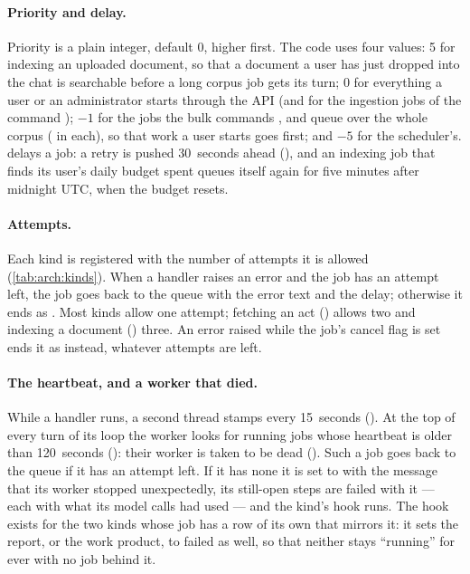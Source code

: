 \paragraph{Priority and delay.} Priority is a plain integer, default 0, higher first. The
code uses four values: 5 for indexing an uploaded document, so that a document a user has
just dropped into the chat is searchable before a long corpus job gets its turn; 0 for
everything a user or an administrator starts through the API (and for the ingestion jobs of
the command ); $-1$ for the jobs the bulk commands
,  and  queue over
the whole corpus ( in each), so that work a user starts goes first; and $-5$
for the scheduler's.  delays
a job: a retry is pushed 30~seconds ahead (), and an indexing job that finds
its user's daily budget spent queues itself again for five minutes after midnight UTC, when
the budget resets.

\paragraph{Attempts.} Each kind is registered with the number of attempts it is allowed
(\cref{tab:arch:kinds}). When a handler raises an error and the job has an attempt left, the
job goes back to the queue with the error text and the delay; otherwise it ends as
. Most kinds allow one attempt; fetching an act () allows two
and indexing a document () three. An error raised while the job's
cancel flag is set ends it as  instead, whatever attempts are left.

\paragraph{The heartbeat, and a worker that died.} While a handler runs, a second thread
stamps  every 15~seconds (). At the top of every turn of
its loop the worker looks for running jobs whose heartbeat is older than 120~seconds
(): their worker is taken to be dead (). Such a job goes
back to the queue if it has an attempt left. If it has none it is set to  with
the message that its worker stopped unexpectedly, its still-open steps are failed with it
--- each with what its model calls had used --- and the kind's  hook runs.
The hook exists for the two kinds whose job has a row of its own that mirrors it: it sets
the report, or the work product, to failed as well, so that neither stays \enquote{running}
for ever with no job behind it.

